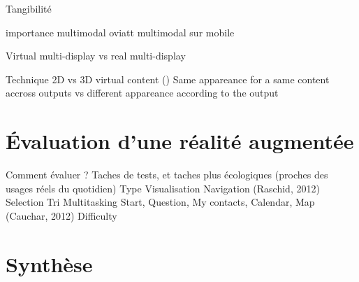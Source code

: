 	        Tangibilité

            importance multimodal oviatt \cite{Oviatt2003}
            multimodal sur mobile \cite{HuerstVanWezel2011}

        Virtual multi-display vs real multi-display 

        Technique 
            2D vs 3D virtual content (\cite{SerranoHildebrandtSubramanianEtAl2014})
            Same appareance for a same content accross outputs vs different appareance according to the output \cite{GrubertHeinischQuigleyEtAl2015} 


\section*{Évaluation d'une réalité augmentée}
Comment évaluer ? Taches de tests, et taches plus écologiques (proches des usages réels du quotidien) \cite{DuenserGrassetBillinghurst2008}
    Type
        Visualisation 
        Navigation \cite{EnsFinneganIrani2014} (Raschid, 2012) 
        Selection \cite{EnsFinneganIrani2014}
        Tri \cite{RobertsonCzerwinskiLarsonEtAl1998}
        Multitasking 
            Start, Question, My contacts, Calendar, Map (Cauchar, 2012) \cite{EnsFinneganIrani2014} 
    Difficulty


\section*{Synthèse}